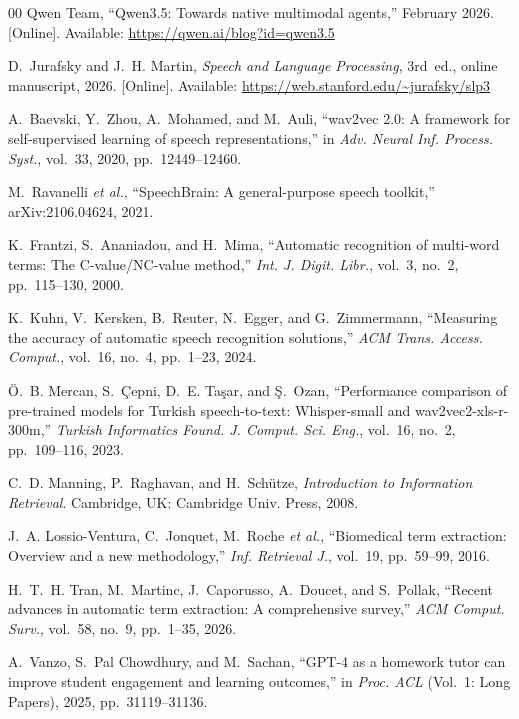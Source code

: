 \documentclass[conference]{IEEEtran}
\begin{document}
\begin{thebibliography}{00}
Qwen Team, ``{Qwen3.5}: Towards native multimodal agents,'' February 2026. [Online]. Available: \url{https://qwen.ai/blog?id=qwen3.5}

D.~Jurafsky and J.~H. Martin, \emph{Speech and Language Processing}, 3rd~ed., online manuscript, 2026. [Online]. Available: \url{https://web.stanford.edu/~jurafsky/slp3}

A.~Baevski, Y.~Zhou, A.~Mohamed, and M.~Auli, ``wav2vec 2.0: A framework for self-supervised learning of speech representations,'' in \emph{Adv. Neural Inf. Process. Syst.}, vol.~33, 2020, pp.~12449--12460.

M.~Ravanelli \emph{et al.}, ``{SpeechBrain}: A general-purpose speech toolkit,'' arXiv:2106.04624, 2021.

K.~Frantzi, S.~Ananiadou, and H.~Mima, ``Automatic recognition of multi-word terms: The C-value/NC-value method,'' \emph{Int. J. Digit. Libr.}, vol.~3, no.~2, pp.~115--130, 2000.

K.~Kuhn, V.~Kersken, B.~Reuter, N.~Egger, and G.~Zimmermann, ``Measuring the accuracy of automatic speech recognition solutions,'' \emph{ACM Trans. Access. Comput.}, vol.~16, no.~4, pp.~1--23, 2024.

{\"O}.~B. Mercan, S.~{\c{C}}epni, D.~E. Ta{\c{s}}ar, and {\c{S}}.~Ozan, ``Performance comparison of pre-trained models for Turkish speech-to-text: Whisper-small and wav2vec2-xls-r-300m,'' \emph{Turkish Informatics Found. J. Comput. Sci. Eng.}, vol.~16, no.~2, pp.~109--116, 2023.

C.~D. Manning, P.~Raghavan, and H.~Sch{\"u}tze, \emph{Introduction to Information Retrieval}. Cambridge, UK: Cambridge Univ. Press, 2008.

J.~A. Lossio-Ventura, C.~Jonquet, M.~Roche \emph{et al.}, ``Biomedical term extraction: Overview and a new methodology,'' \emph{Inf. Retrieval J.}, vol.~19, pp.~59--99, 2016.

H.~T.~H. Tran, M.~Martinc, J.~Caporusso, A.~Doucet, and S.~Pollak, ``Recent advances in automatic term extraction: A comprehensive survey,'' \emph{ACM Comput. Surv.}, vol.~58, no.~9, pp.~1--35, 2026.

A.~Vanzo, S.~Pal Chowdhury, and M.~Sachan, ``{GPT-4} as a homework tutor can improve student engagement and learning outcomes,'' in \emph{Proc. ACL} (Vol.~1: Long Papers), 2025, pp.~31119--31136.


\end{thebibliography}
\end{document}
